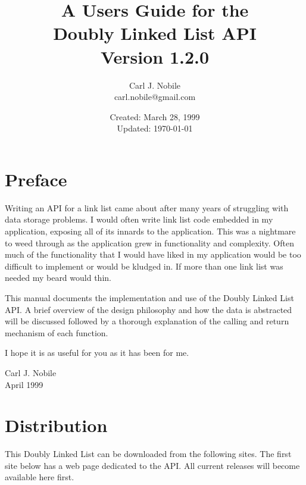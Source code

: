 \documentclass[10pt,letterpaper,titlepage]{article}
\begin{document}
\title{A Users Guide for the\\
       Doubly Linked List API\\
       Version 1.2.0}
\author{Carl J. Nobile\\
	carl.nobile@gmail.com}
\date{Created: March 28, 1999\\
	Updated: \today}
\maketitle

\section*{Preface}
Writing an API for a link list came about after many years of struggling with data storage problems.  I would often write link list code embedded in my application, exposing all of its innards to the application.  This was a nightmare to weed through as the application grew in functionality and complexity.  Often much of the functionality that I would have liked in my application would be too difficult to implement or would be kludged in.  If more than one link list was needed my beard would thin.
\vspace{8pt}

\noindent
This manual documents the implementation and use of the Doubly Linked List API.  A brief overview of the design philosophy and how the data is abstracted will be discussed followed by a thorough explanation of the calling and return mechanism of each function.
\vspace{8pt}

\noindent
I hope it is as useful for you as it has been for me.
\vspace{8pt}
\begin{flushright}
Carl J. Nobile\\
April 1999
\end{flushright}
\newpage

\tableofcontents
\newpage

\section{Distribution}
This Doubly Linked List can be downloaded from the following sites.  The first site below has a web page dedicated to the API.  All current releases will become available here first.
\vspace{8pt}
\end{document}
